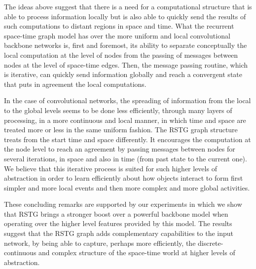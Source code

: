 \documentclass{article}
\begin{document}
The ideas above suggest that there is a need for a computational structure that is able to process information locally but is also able to quickly send the results of such computations to distant regions in space and time. What the recurrent space-time graph model has over the more uniform and local convolutional backbone networks is, first and foremost, its ability to separate conceptually the local computation at the level of nodes from the passing of messages between nodes at the level of space-time edges. Then, the message passing routine, which is iterative, can quickly send information globally and reach a convergent state that puts in agreement the local computations. 

In the case of convolutional networks, the spreading of information from the local to the global levels seems to be done less efficiently, through many layers of processing, in a more continuous and local manner, in which time and space are treated more or less in the same uniform fashion. The RSTG graph structure treats from the start time and space differently. It encourages the computation at the node level to reach an agreement by passing messages between nodes for several iterations, in space and also in time (from past state to the current one). We believe that this iterative process is suited for such higher levels of abstraction in order to learn efficiently about how objects interact to form first simpler and more local events and then more complex and more global activities.

These concluding remarks are supported by our experiments in which we show that RSTG brings a stronger boost over a powerful backbone model when operating over the higher level features provided by this model. The results suggest that the RSTG graph adds complementary capabilities to the input network, by being able to capture, perhaps more efficiently, the discrete-continuous and complex structure of the space-time world at higher levels of abstraction.
\end{document}

